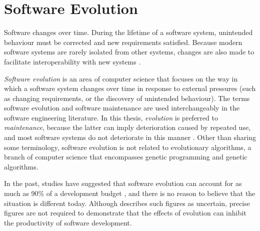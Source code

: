 \section{Software Evolution}
\label{sec:intro_to_software_evo}
Software changes over time. During the lifetime of a software system, unintended behaviour must be corrected and new requirements satisfied. Because modern software systems are rarely isolated from other systems, changes are also made to facilitate interoperability with new systems \cite{sjoberg93quantifying}. 

% 

\emph{Software evolution} is an area of computer science that focuses on the way in which a software system changes over time in response to external pressures (such as changing requirements, or the discovery of unintended behaviour). The terms software evolution and software maintenance are used interchangeably in the software engineering literature. In this thesis, \emph{evolution} is preferred to \emph{maintenance}, because the latter can imply deterioration caused by repeated use, and most software systems do not deteriorate in this manner \cite{ramil00cost}. Other than sharing some terminology, software evolution is not related to evolutionary algorithms, a branch of computer science that encompasses genetic programming and genetic algorithms. 

In the past, studies have suggested that software evolution can account for as much as 90\% of a development budget \cite{erlikh00leveraging,moad90maintaining}, and there is no reason to believe that the situation is different today. Although \cite[ch. 21]{sommerville06software} describes such figures as uncertain, precise figures are not required to demonstrate that the effects of evolution can inhibit the productivity of software development.

